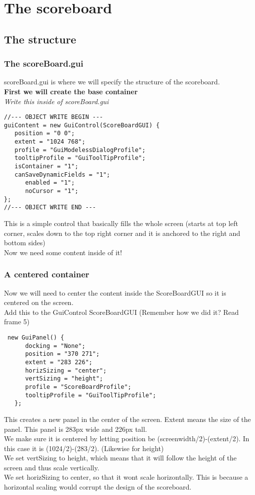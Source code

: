 \section{The scoreboard}
\subsection{The structure}
\begin{frame}[fragile]
\frametitle{The scoreBoard.gui}
scoreBoard.gui is where we will specify the structure of the scoreboard.\\
{\bf First we will create the base container}\\
{\it Write this inside of scoreBoard.gui}
\TS
\begin{lstlisting}
//--- OBJECT WRITE BEGIN ---
guiContent = new GuiControl(ScoreBoardGUI) {
   position = "0 0";
   extent = "1024 768";
   profile = "GuiModelessDialogProfile";
   tooltipProfile = "GuiToolTipProfile";
   isContainer = "1";
   canSaveDynamicFields = "1";
      enabled = "1";
      noCursor = "1";
};
//--- OBJECT WRITE END ---
\end{lstlisting}
This is a simple control that basically fills the whole screen (starts at top left corner, scales down to the top right corner and it is anchored to the right and bottom sides)\\
Now we need some content inside of it!
\end{frame}

\begin{frame}[fragile]
\frametitle{A centered container}
Now we will need to center the content inside the ScoreBoardGUI so it is centered on the screen.\\
Add this to the GuiControl ScoreBoardGUI (Remember how we did it? Read frame 5)\\
\TS
\begin{lstlisting}
 new GuiPanel() {
      docking = "None";
      position = "370 271";
      extent = "283 226";
      horizSizing = "center";
      vertSizing = "height";
      profile = "ScoreBoardProfile";
      tooltipProfile = "GuiToolTipProfile";
   };
\end{lstlisting}
This creates a new panel in the center of the screen. Extent means the size of the panel. This panel is 283px wide and 226px tall.\\
We make sure it is centered by letting position be (screenwidth/2)-(extent/2). In this case it is (1024/2)-(283/2). (Likewise for height)\\
We set vertSizing to height, which means that it will follow the height of the screen and thus scale vertically.\\
We set horizSizing to center, so that it wont scale horizontally. This is because a horizontal scaling would corrupt the design of the scoreboard.
\end{frame}

